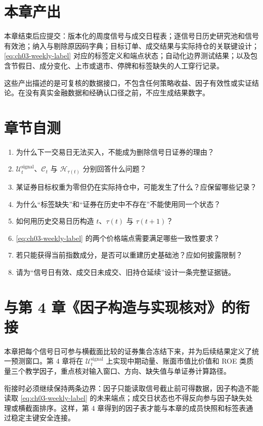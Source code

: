 \section{本章产出}

\begin{outputbox}
本章结束后应提交：版本化的周度信号与成交日程表；逐信号日历史研究池和信号有效池；纳入与剔除原因码字典；目标订单、成交结果与实际持仓的关联键设计；\cref{eq:ch03-weekly-label} 对应的标签定义和端点状态；自动化边界测试结果；以及包含节假日、成分变化、上市或退市、停牌和标签缺失的人工穿行记录。
\end{outputbox}

这些产出描述的是可复核的数据接口，不包含任何策略收益、因子有效性或实证结论。在没有真实金融数据和经确认口径之前，不应生成结果数字。

\section{章节自测}

\begin{quizbox}
\begin{enumerate}
  \item 为什么下一交易日无法买入，不能成为删除信号日证券的理由？
  \item \(\mathcal{U}^{\mathrm{signal}}_t\)、\(\mathcal{C}_t\) 与 \(\mathcal{H}_{\tau(t)}\) 分别回答什么问题？
  \item 某证券目标权重为零但仍在实际持仓中，可能发生了什么？应保留哪些记录？
  \item 为什么“标签缺失”和“证券在历史中不存在”不能使用同一个状态？
  \item 如何用历史交易日历构造 \(t\)、\(\tau(t)\) 与 \(\tau(t+1)\)？
  \item \cref{eq:ch03-weekly-label} 的两个价格端点需要满足哪些一致性要求？
  \item 若只能获得当前指数成分，是否可以重建历史基础池？应如何披露限制？
  \item 请为“信号日有效、成交日未成交、旧持仓延续”设计一条完整证据链。
\end{enumerate}
\end{quizbox}

\section{与第 4 章《因子构造与实现核对》的衔接}

本章把每个信号日可参与横截面比较的证券集合冻结下来，并为后续结果定义了统一预测窗口。第 4 章将在 \(\mathcal{U}^{\mathrm{signal}}_t\) 上实现中期动量、账面市值比价值和 ROE 类质量三个教学因子，重点核对输入窗口、方向、缺失值与单证券计算路径。

衔接时必须继续保持两条边界：因子只能读取信号截止前可得数据，因子构造不能读取 \cref{eq:ch03-weekly-label} 的未来端点；成交日状态也不得反向参与因子缺失处理或横截面排序。这样，第 4 章得到的因子表才能与本章的成员快照和标签表通过稳定主键安全连接。
